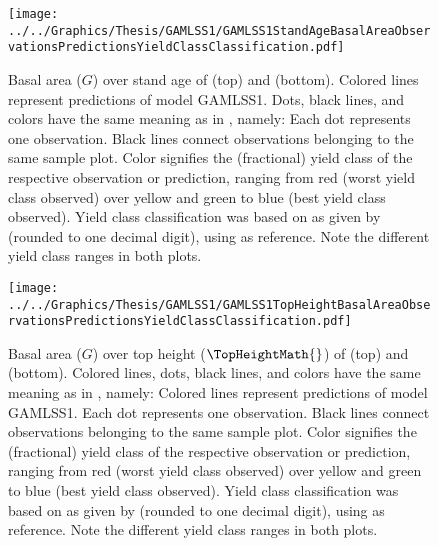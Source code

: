 \begin{figure}[h]
  \centering
  \texttt{[image: ../../Graphics/Thesis/GAMLSS1/GAMLSS1StandAgeBasalAreaObservationsPredictionsYieldClassClassification.pdf]}
  \caption{Basal area (\(G\)) over stand age of \Beech{} (top) and \Spruce{} (bottom).  Colored lines represent predictions of model GAMLSS1.  Dots, black lines, and colors have the same meaning as in , namely:  Each dot represents one observation.  Black lines connect observations belonging to the same sample plot.  Color signifies the (fractional) yield class of the respective observation or prediction, ranging from red (worst yield class observed) over yellow and green to blue (best yield class observed).  Yield class classification was based on \ProductivityIndexText{} as given by  (rounded to one decimal digit), using  as reference.  Note the different yield class ranges in both plots.}
  \label{fig:GAMLSS1StandAgeBasalAreaObservationsPredictionsYieldClassClassification}
\end{figure}

\begin{figure}[h]
  \centering
  \texttt{[image: ../../Graphics/Thesis/GAMLSS1/GAMLSS1TopHeightBasalAreaObservationsPredictionsYieldClassClassification.pdf]}
  \caption{Basal area (\(G\)) over top height (\(\TopHeightMath{}\)) of \Beech{} (top) and \Spruce{} (bottom).  Colored lines, dots, black lines, and colors have the same meaning as in , namely:  Colored lines represent predictions of model GAMLSS1.  Each dot represents one observation.  Black lines connect observations belonging to the same sample plot.  Color signifies the (fractional) yield class of the respective observation or prediction, ranging from red (worst yield class observed) over yellow and green to blue (best yield class observed).  Yield class classification was based on \ProductivityIndexText{} as given by  (rounded to one decimal digit), using  as reference.  Note the different yield class ranges in both plots.}
  \label{fig:GAMLSS1TopHeightBasalAreaObservationsPredictionsYieldClassClassification}
\end{figure}

\clearpage{}

